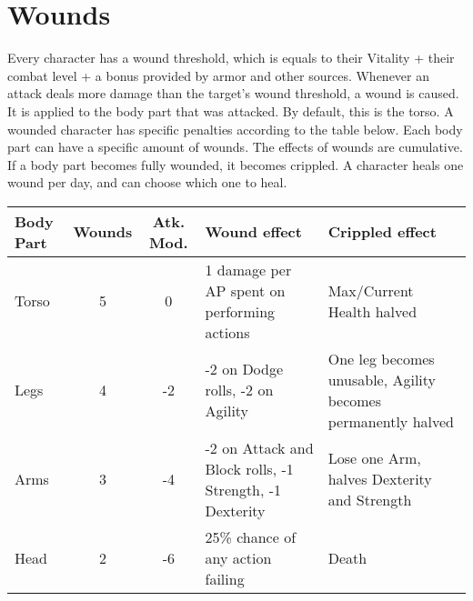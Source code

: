 \section{Wounds}
Every character has a wound threshold, which is equals to their Vitality + their combat level + a bonus provided by armor and other sources. Whenever an attack deals more damage than the target's wound threshold, a wound is caused. It is applied to the body part that was attacked. By default, this is the torso. A wounded character has specific penalties according to the table below. Each body part can have a specific amount of wounds. The effects of wounds are cumulative. If a body part becomes fully wounded, it becomes crippled.
A character heals one wound per day, and can choose which one to heal.


\begin{tabular}{p{1cm} | c | c | p{4cm} | p{4cm}}
Body Part & Wounds & Atk. Mod. & Wound effect & Crippled effect \\ \hline
Torso & 5 & 0 & 1 damage per AP spent on performing actions & Max/Current Health halved\\
Legs & 4 & -2 & -2 on Dodge rolls, -2 on Agility & One leg becomes unusable, Agility becomes permanently halved \\
Arms & 3 & -4 & -2 on Attack and Block rolls, -1 Strength, -1 Dexterity & Lose one Arm, halves Dexterity and Strength\\
Head & 2 & -6 & 25\% chance of any action failing & Death\\
\end{tabular}

